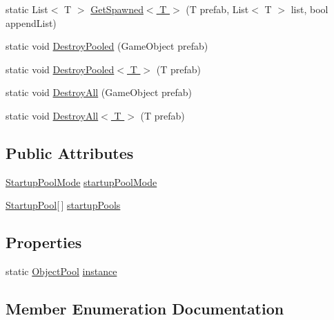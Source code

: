 \begin{DoxyCompactItemize}
\item 
static List$<$ T $>$ \hyperlink{class_object_pool_aa43366a11ed97db8ffc43ad45c79bf03}{Get\+Spawned$<$ T $>$} (T prefab, List$<$ T $>$ list, bool append\+List)
\item 
static void \hyperlink{class_object_pool_aaf07027a350db5fda7319939d46c2a3a}{Destroy\+Pooled} (Game\+Object prefab)
\item 
static void \hyperlink{class_object_pool_a349e231aa570b4a0965559c2d8e995b2}{Destroy\+Pooled$<$ T $>$} (T prefab)
\item 
static void \hyperlink{class_object_pool_ab48a02309b21b9ece9596b489231d339}{Destroy\+All} (Game\+Object prefab)
\item 
static void \hyperlink{class_object_pool_a8a463339ca4cb4b3b14edadc4143931d}{Destroy\+All$<$ T $>$} (T prefab)
\end{DoxyCompactItemize}
\subsection*{Public Attributes}
\begin{DoxyCompactItemize}
\item 
\hyperlink{class_object_pool_ad94dc76a38c1ce6273fe9a25590e2e7a}{Startup\+Pool\+Mode} \hyperlink{class_object_pool_abfc2e120220d5a26728410df1298ecb3}{startup\+Pool\+Mode}
\item 
\hyperlink{class_object_pool_1_1_startup_pool}{Startup\+Pool}\mbox{[}$\,$\mbox{]} \hyperlink{class_object_pool_a6389859576fb2d968ceed034d8be7654}{startup\+Pools}
\end{DoxyCompactItemize}
\subsection*{Properties}
\begin{DoxyCompactItemize}
\item 
static \hyperlink{class_object_pool}{Object\+Pool} \hyperlink{class_object_pool_ab67914e0f6e4521ae324566a3e06e927}{instance}
\end{DoxyCompactItemize}


\subsection{Member Enumeration Documentation}
